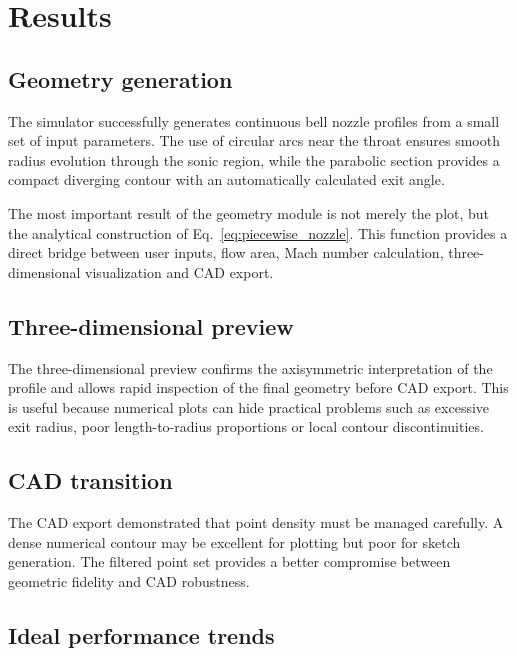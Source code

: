 \documentclass[journal,article,submit,oneauthor]{Definitions/mdpi}
\begin{document}
\section{Results}

\subsection{Geometry generation}

The simulator successfully generates continuous bell nozzle profiles from a small set of input parameters. The use of circular arcs near the throat ensures smooth radius evolution through the sonic region, while the parabolic section provides a compact diverging contour with an automatically calculated exit angle.

The most important result of the geometry module is not merely the plot, but the analytical construction of Eq.~\eqref{eq:piecewise_nozzle}. This function provides a direct bridge between user inputs, flow area, Mach number calculation, three-dimensional visualization and CAD export.

\subsection{Three-dimensional preview}

The three-dimensional preview confirms the axisymmetric interpretation of the profile and allows rapid inspection of the final geometry before CAD export. This is useful because numerical plots can hide practical problems such as excessive exit radius, poor length-to-radius proportions or local contour discontinuities.

\subsection{CAD transition}

The CAD export demonstrated that point density must be managed carefully. A dense numerical contour may be excellent for plotting but poor for sketch generation. The filtered point set provides a better compromise between geometric fidelity and CAD robustness.

\subsection{Ideal performance trends}
\end{document}
